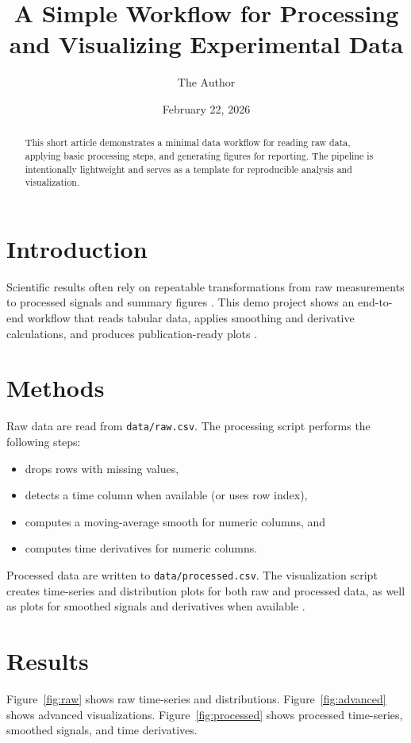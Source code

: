 \documentclass[11pt]{article}
\title{A Simple Workflow for Processing and Visualizing Experimental Data}
\author{The Author}
\date{February 22, 2026}
\begin{document}
\maketitle

\begin{abstract}
This short article demonstrates a minimal data workflow for reading raw data,
applying basic processing steps, and generating figures for reporting. The
pipeline is intentionally lightweight and serves as a template for
reproducible analysis and visualization.
\end{abstract}

\section{Introduction}
Scientific results often rely on repeatable transformations from raw
measurements to processed signals and summary figures
\cite{wilkinson2016fair,lowe2019good}. This demo project shows an end-to-end
workflow that reads tabular data, applies smoothing and derivative
calculations, and produces publication-ready plots
\cite{tufte2001visual}.

\section{Methods}
Raw data are read from \texttt{data/raw.csv}. The processing script performs
the following steps:
\begin{itemize}
  \item drops rows with missing values,
  \item detects a time column when available (or uses row index),
  \item computes a moving-average smooth for numeric columns, and
  \item computes time derivatives for numeric columns.
\end{itemize}
Processed data are written to \texttt{data/processed.csv}. The visualization
script creates time-series and distribution plots for both raw and processed
data, as well as plots for smoothed signals and derivatives when available
\cite{mckenna2021dataviz}.

\section{Results}
Figure~\ref{fig:raw} shows raw time-series and distributions.
Figure~\ref{fig:advanced} shows advanced visualizations.
Figure~\ref{fig:processed} shows processed time-series, smoothed signals, and
time derivatives.
\end{document}
